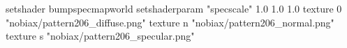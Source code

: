 setshader bumpspecmapworld
setshaderparam "specscale" 1.0 1.0 1.0
   texture 0 "nobiax/pattern206_diffuse.png"
   texture n "nobiax/pattern206_normal.png"
   texture s "nobiax/pattern206_specular.png"
